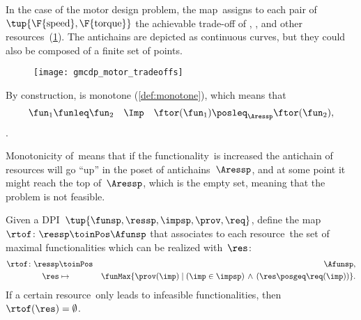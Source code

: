\begin{example}
    In the case of the motor design problem, the map~\ftor assigns
    to each pair of~$\tup{\F{\text{speed}},\F{\text{torque}}}$
    the achievable trade-off of , , and other resources~(\cref{fig:motor-trade-offs}).
    The antichains are depicted as continuous curves, but they could also
    be composed of a finite set of points.

\end{example}
\begin{figure}
    \texttt{[image: gmcdp\_motor\_tradeoffs]}
    \caption{}
    \label{fig:motor-trade-offs}
\end{figure}


By construction, \ftor is monotone (\cref{def:monotone}), which means that
\begin{equation*}
    \fun_{1}\funleq\fun_{2}\quad\Imp\quad\ftor(\fun_{1})\posleq_{\Aressp}\ftor(\fun_{2}),
\end{equation*}.


Monotonicity of~\ftor means that if the functionality~\fun is increased the antichain of resources will go ``up'' in the poset of antichains~$\Aressp$,
and at some point it might reach the top of~$\Aressp$, which is the empty set, meaning that the problem is not feasible.


\begin{definition}
    \label{def:rtof}
    Given a DPI~$\tup{ \funsp,\ressp,\impsp,\prov,\req}$,
    define the map~$\rtof\colon \ressp\toinPos \Afunsp$ that associates
    to each resource~\res the set of maximal functionalities which can be realized with~$\res$:
    \begin{eqnarray*}
        \rtof\colon \ressp & \toinPos & \Afunsp,\\
        \res& \mapsto & \funMax\{\prov(\imp)\mid\left(\imp\in\impsp\right)\,\wedge\,\left(\res\posgeq\req(\imp)\right)\}.
    \end{eqnarray*}
    If a certain resource~\res only leads to infeasible functionalities, then~$\rtof(\res)=\emptyset$.
\end{definition}


